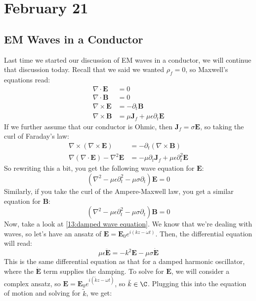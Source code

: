 \section{February 21}
\subsection{EM Waves in a Conductor}
Last time we started our discussion of EM waves in a conductor, we will continue that discussion today.
Recall that we said we wanted \( \rho_f = 0 \), so Maxwell's equations read:
\begin{align*}
	\nabla \cdot \mathbf{E} &= 0 \\ 
	\nabla \cdot \mathbf{B} &= 0 \\ 
	\nabla \times \mathbf{E} &=  -\partial_t \mathbf{B} \\ 
	\nabla \times \mathbf{B} &= \mu \mathbf{J}_f + \mu \epsilon \partial_t \mathbf{E}
\end{align*}
If we further assume that our conductor is Ohmic, then \( \mathbf{J}_f = \sigma \mathbf{E} \), so taking the
curl of Faraday's law:
\begin{align*}
	\nabla \times(\nabla \times \mathbf{E}) &= -\partial_t (\nabla \times \mathbf{B})\\
	\nabla (\nabla \cdot \mathbf{E}) - \nabla^2 \mathbf{E} &= - \mu \partial_t \mathbf{J}_f + \mu \epsilon
	\partial_t^2 \mathbf{E}
\end{align*}
So rewriting this a bit, you get the following wave equation for \( \mathbf{E} \):
\begin{equation}
	\label{13:damped wave equation}
	(\nabla^2 - \mu \epsilon \partial_t^2 - \mu \sigma \partial_t) \mathbf{E} = 0
\end{equation}
Similarly, if you take the curl of the Ampere-Maxwell law, you get a similar equation for \( \mathbf{B} \):
\[
	(\nabla^2 - \mu \epsilon \partial_t^2 - \mu \sigma \partial_t) \mathbf{B} = 0
\]
Now, take a look at \ref{13:damped wave equation}. We know that we're dealing with waves, so let's have an
ansatz of \( \mathbf{E} = \mathbf{E}_0 e^{i(kz - \omega t)} \). Then, the differential equation will read:
\[
	\mu \epsilon \ddot{\mathbf{E}} = - k^2 \mathbf{E} - \mu \sigma \dot{\mathbf{E}}
\]
This is the same differential equation as that for a damped harmonic oscillator, where the \(
\dot{\mathbf{E}} \) term supplies the damping. To solve for \( \mathbf{E} \), we will consider a complex
ansatz, so \( \mathbf{E} = \mathbf{E}_0 e^{i (\tilde k z - \omega t)} \), so \( \tilde k \in \C \). Plugging
this into the equation of motion and solving for \( \tilde k \), we get:
